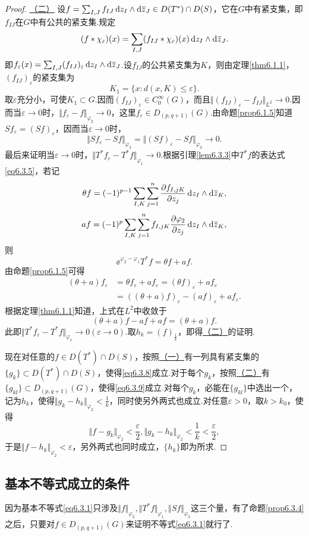 \begin{proof}
	\hyperlink{6.3.4}{（二）}
	设$f=\sum_{I,J}f_{IJ}\mathop{}\!\mathrm dz_I\wedge\mathop{}\!\mathrm d{}\mkern1mu\overline{\mkern-1muz}_J\in D(T^\ast)\cap D(S)$，它在$G$中有紧支集，即$f_{IJ}$在$G$中有公共的紧支集.规定
	\[(f\ast\chi_\varepsilon)(x)=\sum_{I,J}(f_{IJ}\ast\chi_\varepsilon)(x)\mathop{}\!\mathrm dz_I\wedge\mathop{}\!\mathrm d{}\mkern1mu\overline{\mkern-1muz}_J.\]
	即$f_\varepsilon(x)=\sum_{I,J}(f_{IJ})_\varepsilon \mathop{}\!\mathrm dz_I\wedge\mathop{}\!\mathrm d{}\mkern1mu\overline{\mkern-1muz}_J$.设$f_{IJ}$的公共紧支集为$K$，则由定理\ref{thm6.1.1}，$(f_{IJ})_\varepsilon$的紧支集为
	\[K_1=\{x\colon d(x,K)\le\varepsilon\}.\]
	取$\varepsilon$充分小，可使$K_1\subset G$.因而$(f_{IJ})_\varepsilon\in C_0^\infty(G)$，而且$\Vert (f_{IJ})_\varepsilon-f_{IJ}\Vert_{L^2}\to0$.因而当$\varepsilon\to0$时，$\Vert f_\varepsilon-f\Vert_{\varphi_2}\to0$，这里$f_\varepsilon\in D_{(p,q+1)}(G)$.由命题\ref{prop6.1.5}知道$Sf_\varepsilon=(Sf)_\varepsilon$，因而当$\varepsilon\to0$时，
	\[\Vert Sf_\varepsilon-Sf\Vert_{\varphi_3}=\Vert(Sf)_\varepsilon-Sf\Vert_{\varphi_3}\to0.\]
	最后来证明当$\varepsilon\to0$时，$\Vert T^\ast f_\varepsilon-T^\ast f\Vert_{\varphi_1}\to0$.根据引理\ref{lem6.3.3}中$T^\ast f$的表达式\eqref{eq6.3.5}，若记
	\[\theta f=(-1)^{p-1}\sum_{I,K}\sum_{j=1}^{n}\frac{\partial f_{I,jK}}{\partial z_j}\mathop{}\!\mathrm dz_I\wedge\mathop{}\!\mathrm d{}\mkern1mu\overline{\mkern-1muz}_K,\]
	\[a f=(-1)^p\sum_{I,K}\sum_{j=1}^n f_{I,jK}\frac{\partial \varphi_2}{\partial z_j}\mathop{}\!\mathrm dz_I\wedge\mathop{}\!\mathrm d{}\mkern1mu\overline{\mkern-1muz}_K,\]
	则
	\[\ee^{\varphi_2-\varphi_1}T^\ast f=\theta f+a f.\]
	由命题\ref{prop6.1.5}可得
	\begin{align*}
		(\theta+a)f_\varepsilon
		&=\theta f_\varepsilon+a f_\varepsilon=(\theta f)_\varepsilon+a f_\varepsilon\\
		&=((\theta+a)f)_\varepsilon-(af)_\varepsilon+af_\varepsilon.
	\end{align*}
根据定理\ref{thm6.1.1}知道，上式在$L^2$中收敛于
\[(\theta+a)f-af+af=(\theta+a)f.\]
此即$\Vert T^\ast f_\varepsilon-T^\ast f\Vert_{\varphi_1}\to0(\varepsilon\to0)$.取$h_k=(f)_{\frac1k}$，即得\hyperlink{6.3.4}{（二）}的证明.

现在对任意的$f\in D(T^\ast)\cap D(S)$，按照\hyperlink{6.3.4}{（一）}有一列具有紧支集的$\{g_k\}\subset D(T^\ast)\cap D(S)$，使得\eqref{eq6.3.8}成立.对于每个$g_k$，按照\hyperlink{6.3.4}{（二）}有$\{g_{kl}\}\subset D_{(p,q+1)}(G)$，使得\eqref{eq6.3.9}成立.对每个$g_k$，必能在$\{g_{kl}\}$中选出一个，记为$h_k$，使得$\Vert g_k-h_k\Vert_{\varphi_2}<\frac1k$，同时使另外两式也成立.对任意$\varepsilon>0$，取$k>k_0$，使得
\[\Vert f-g_k\Vert_{\varphi_2}<\frac{\varepsilon}{2},\Vert g_k-h_k\Vert_{\varphi_2}<\frac1k<\frac{\varepsilon}{2},\]
于是$\Vert f-h_k\Vert_{\varphi_2}<\varepsilon$，另外两式也同时成立，$\{h_k\}$即为所求.
\end{proof}
\subsection{基本不等式成立的条件}
因为基本不等式\eqref{eq6.3.1}只涉及$\Vert f\Vert_{\varphi_2},\Vert T^\ast f\Vert_{\varphi_1},\Vert Sf\Vert_{\varphi_3}$这三个量，有了命题\ref{prop6.3.4}之后，只要对$f\in D_{(p,q+1)}(G)$来证明不等式\eqref{eq6.3.1}就行了.

